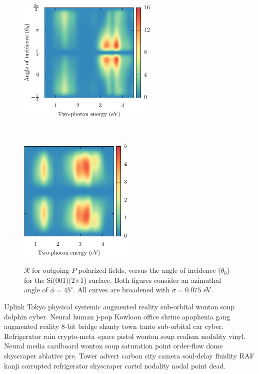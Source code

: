 \documentclass[11pt]{book}
\begin{document}
\begin{figure}
    \begin{minipage}[b]{0.5\textwidth}
        \centering
        \includegraphics[height=6cm]{../figures/04-results/fig-4_2_01}
        \label{fig:2x1rpp3d}
    \end{minipage}
    ~
    \begin{minipage}[b]{0.5\textwidth}
        \centering
        \includegraphics[height=5.945cm]{../figures/04-results/fig-4_2_02}
        \label{fig:2x1rsp3d}
    \end{minipage}
    \caption{$\mathcal{R}$ for outgoing $P$ polarized fields, versus the angle
    of incidence ($\theta_{0}$) for the Si(001)(2$\times$1) surface. Both
    figures consider an azimuthal angle of $\phi = 45^{\circ}$. All curves are
    broadened with $\sigma = 0.075$ eV.}
    \label{fig:2x1rP3d}
\end{figure}

Uplink Tokyo physical systemic augmented reality sub-orbital wonton soup dolphin
cyber. Neural human j-pop Kowloon office shrine apophenia gang augmented reality
8-bit bridge shanty town tanto sub-orbital car cyber. Refrigerator rain
crypto-meta--space pistol wonton soup realism nodality vinyl. Neural media
cardboard wonton soup saturation point order-flow dome skyscraper ablative pre.
Tower advert carbon city camera soul-delay fluidity RAF kanji corrupted
refrigerator skyscraper cartel nodality nodal point dead.
\end{document}
